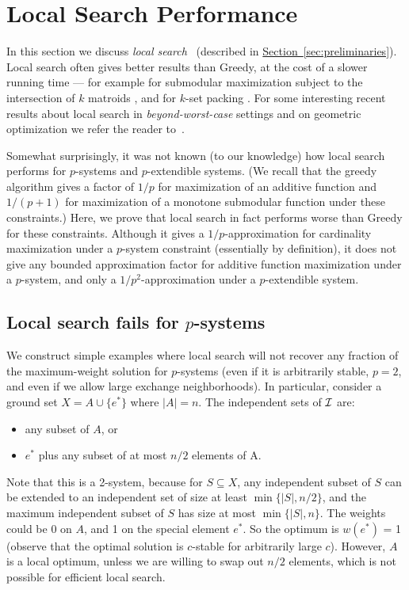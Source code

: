 \section{Local Search Performance}\label{sec:local search}


In this section we discuss {\em local search}~\cite{lenstra2003local} (described in \hyperref[sec:preliminaries]{Section~\ref{sec:preliminaries}}).
Local search often gives better results than Greedy, at the cost of a slower running time --- for example for submodular maximization subject to the intersection of $k$ matroids \cite{lee2009submodular,filmus2012power}, and for $k$-set packing \cite{SviridenkoW13,Cygan13,FurerY14}. For some interesting recent results about local search in \textit{beyond-worst-case} settings and on geometric optimization we refer the reader to~\cite{cohen2016local,cohen2014unreasonable,cohen17}.

Somewhat surprisingly, it was not known (to our knowledge) how local search performs for $p$-systems and $p$-extendible systems. (We recall that the greedy algorithm gives a factor of $1/p$ for maximization of an additive function and $1/(p+1)$ for maximization of a monotone submodular function under these constraints.)
Here, we prove that local search in fact performs worse than Greedy for these constraints. Although it gives a $1/p$-approximation for cardinality maximization under a $p$-system constraint (essentially by definition), it does not give any bounded approximation factor for additive function maximization under a $p$-system, and only a $1/p^2$-approximation under a $p$-extendible system. 


\subsection{Local search fails for $p$-systems}
We construct simple examples where local search will not recover any fraction of the maximum-weight solution for $p$-systems (even if it is arbitrarily stable, $p=2$, and even if we allow large exchange neighborhoods). In particular, consider a ground set $X = A \cup \{e^*\}$ where $|A|=n$. The independent sets of $\mathcal{I}$ are:
\begin{itemize}
\item any subset of $A$, or
\item $e^*$ plus any subset of at most $n/2$ elements of A. 
\end{itemize}

Note that this is a 2-system, because for $S \subseteq X$, any independent subset of $S$ can be extended to an independent set of size at least $\min \{|S|, n/2\}$, and the maximum independent subset of $S$ has size at most $\min \{|S|,n\}$. The weights could be 0 on $A$, and 1 on the special element $e^*$. So the optimum is $w(e^*)$ = 1 (observe that the optimal solution is $c$-stable for arbitrarily large $c$). However, $A$ is a local optimum, unless we are willing to swap out $n/2$ elements, which is not possible for efficient local search.



